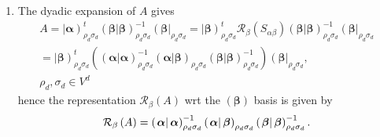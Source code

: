 \documentclass[aps,preprint]{revtex4}
\begin{document}
\begin{enumerate}
\begin{enumerate}
\begin{enumerate}
\item The dyadic expansion of $A$ gives 
\begin{gather}
A=\left\vert \boldsymbol{\alpha }\right) _{\rho _{d}\sigma _{d}}^{t}\left(
\left. \boldsymbol{\beta }\right\vert \boldsymbol{\beta }\right) _{\rho
_{d}\sigma _{d}}^{-1}\left( \boldsymbol{\beta }\right\vert _{\rho _{d}\sigma
_{d}}=\left\vert \boldsymbol{\beta }\right) _{\rho _{d}\sigma _{d}}^{t}%
\mathcal{R}_{\beta }\left( S_{\alpha \beta }\right) \left( \left. 
\boldsymbol{\beta }\right\vert \boldsymbol{\beta }\right) _{\rho _{d}\sigma
_{d}}^{-1}\left( \boldsymbol{\beta }\right\vert _{\rho _{d}\sigma _{d}} \\
=\left\vert \boldsymbol{\beta }\right) _{\rho _{d}\sigma _{d}}^{t}\left( 
\overset{}{\left( \left. \boldsymbol{\alpha }\right\vert \boldsymbol{\alpha }%
\right) _{\rho _{d}\sigma _{d}}^{-1}\left( \left. \boldsymbol{\alpha }%
\right\vert \boldsymbol{\beta }\right) _{\rho _{d}\sigma _{d}}\left( \left. 
\boldsymbol{\beta }\right\vert \boldsymbol{\beta }\right) _{\rho _{d}\sigma
_{d}}^{-1}}\right) \left( \boldsymbol{\beta }\right\vert _{\rho _{d}\sigma
_{d}},\; \\
\rho _{d},\sigma _{d}\in V^{d}
\end{gather}%
hence the representation $\mathcal{R}_{\beta }\left( A\right) $ wrt the $%
\left( \boldsymbol{\beta }\right) $ basis is given by 
\begin{equation}
\mathcal{R}_{\beta }\left( A\right) =\left( \left. \boldsymbol{\alpha }%
\right\vert \boldsymbol{\alpha }\right) _{\rho _{d}\sigma _{d}}^{-1}\left(
\left. \boldsymbol{\alpha }\right\vert \boldsymbol{\beta }\right) _{\rho
_{d}\sigma _{d}}\left( \left. \boldsymbol{\beta }\right\vert \boldsymbol{%
\beta }\right) _{\rho _{d}\sigma _{d}}^{-1}.
\end{equation}


\end{enumerate}
\end{enumerate}
\end{enumerate}
\end{document}
